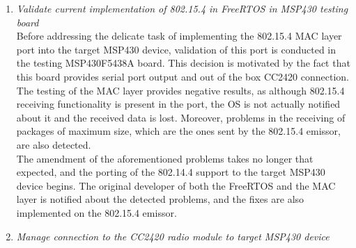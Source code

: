 		\begin{enumerate}
		\item \emph{Validate current implementation of 802.15.4 in FreeRTOS in MSP430 testing board}\\


		Before addressing the delicate task of implementing the 802.15.4 MAC layer port into the target MSP430 device, validation of this port is conducted in the testing MSP430F5438A board. This decision is motivated by the fact that this board provides serial port output and out of the box CC2420 connection.\\

		The testing of the MAC layer provides negative results, as although 802.15.4 receiving functionality is present in the port, the OS is not actually notified about it and the received data is lost. Moreover, problems in the receiving of packages of maximum size, which are the ones sent by the 802.15.4 emissor, are also detected.\\

		The amendment of the aforementioned problems takes no longer that expected, and the porting of the 802.14.4 support to the target MSP430 device begins. The original developer of both the FreeRTOS and the MAC layer is notified about the detected problems, and the fixes are also implemented on the 802.15.4 emissor.\\

		\item\emph{Manage connection to the CC2420 radio module to target MSP430 device}\\



\end{enumerate}
